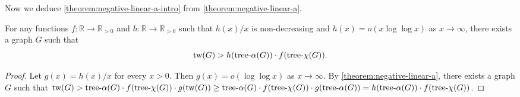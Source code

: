 \documentclass[a4paper, cleveref, autoref, thm-restate]{lipics-v2021}
\newtheorem{question}{Question}
\newcommand{\twG}{{\rm tw}(G)}
\newcommand{\tw}{{\rm tw}}
\newcommand{\treeaG}{{\rm tree\textnormal{-}}\alpha(G)}
\newcommand{\treea}{{\rm tree}\textnormal{-}\alpha}
\newcommand{\treex}{{\rm tree}\textnormal{-}\chi}
\newcommand{\treexG}{{\rm tree\textnormal{-}}\chi(G)}
\begin{document}
Now we deduce \cref{theorem:negative-linear-a-intro} from \cref{theorem:negative-linear-a}.

\begin{corollary}
    For any functions $f \colon {\mathbb R} \rightarrow {\mathbb R}_{>0}$ and $h \colon {\mathbb R} \rightarrow {\mathbb R}_{>0}$ such that $h(x)/x$ is non-decreasing and $h(x) = o(x\log\log x)$ as $x \to \infty$, there exists a graph $G$ such that $$\tw(G) > h(\treea(G)) \cdot f(\treex(G)).$$
\end{corollary}

\begin{proof}
Let $g(x) = h(x)/x$ for every $x>0$.
Then $g(x) = o(\log\log x)$ as $x \to \infty$.
By \cref{theorem:negative-linear-a}, there exists a graph $G$ such that $\tw(G) > \treea(G) \cdot f(\treex(G)) \cdot g(\tw(G)) \geq \treea(G) \cdot f(\treex(G)) \cdot g(\treea(G)) = h(\treea(G)) \cdot f(\treex(G))$.
\end{proof}

%
%











\end{document}
